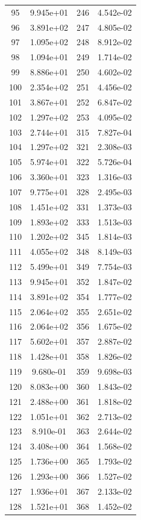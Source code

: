 \documentclass[12pt]{article}
\begin{document}
\begin{longtable}{@{}cccc@{}}
95 & 9.945e+01 & 246 & 4.542e-02 \\
96 & 3.891e+02 & 247 & 4.805e-02 \\
97 & 1.095e+02 & 248 & 8.912e-02 \\
98 & 1.094e+01 & 249 & 1.714e-02 \\
99 & 8.886e+01 & 250 & 4.602e-02 \\
100 & 2.354e+02 & 251 & 4.456e-02 \\
101 & 3.867e+01 & 252 & 6.847e-02 \\
102 & 1.297e+02 & 253 & 4.095e-02 \\
103 & 2.744e+01 & 315 & 7.827e-04 \\
104 & 1.297e+02 & 321 & 2.308e-03 \\
105 & 5.974e+01 & 322 & 5.726e-04 \\
106 & 3.360e+01 & 323 & 1.316e-03 \\
107 & 9.775e+01 & 328 & 2.495e-03 \\
108 & 1.451e+02 & 331 & 1.373e-03 \\
109 & 1.893e+02 & 333 & 1.513e-03 \\
110 & 1.202e+02 & 345 & 1.814e-03 \\
111 & 4.055e+02 & 348 & 8.149e-03 \\
112 & 5.499e+01 & 349 & 7.754e-03 \\
113 & 9.945e+01 & 352 & 1.847e-02 \\
114 & 3.891e+02 & 354 & 1.777e-02 \\
115 & 2.064e+02 & 355 & 2.651e-02 \\
116 & 2.064e+02 & 356 & 1.675e-02 \\
117 & 5.602e+01 & 357 & 2.887e-02 \\
118 & 1.428e+01 & 358 & 1.826e-02 \\
119 & 9.680e-01 & 359 & 9.698e-03 \\
120 & 8.083e+00 & 360 & 1.843e-02 \\
121 & 2.488e+00 & 361 & 1.818e-02 \\
122 & 1.051e+01 & 362 & 2.713e-02 \\
123 & 8.910e-01 & 363 & 2.644e-02 \\
124 & 3.408e+00 & 364 & 1.568e-02 \\
125 & 1.736e+00 & 365 & 1.793e-02 \\
126 & 1.293e+00 & 366 & 1.527e-02 \\
127 & 1.936e+01 & 367 & 2.133e-02 \\
128 & 1.521e+01 & 368 & 1.452e-02 \\

\end{longtable}
\end{document}
